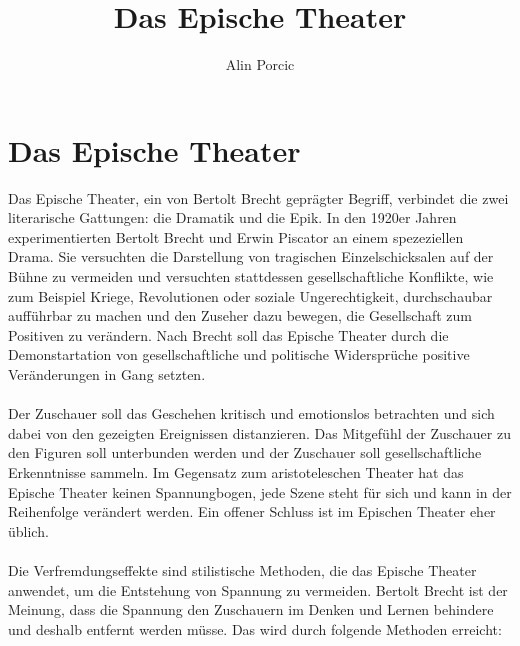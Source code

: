 \documentclass[a4paper]{article}
\title{Das Epische Theater}
\author{Alin Porcic}
\begin{document}
	\maketitle

	\newpage

	\section{Das Epische Theater}

        Das Epische Theater, ein von Bertolt Brecht geprägter Begriff, verbindet die zwei literarische Gattungen: die Dramatik und die Epik. In den 1920er Jahren experimentierten Bertolt Brecht und Erwin Piscator an einem spezeziellen  Drama. Sie versuchten die Darstellung von tragischen Einzelschicksalen auf der Bühne zu vermeiden und versuchten stattdessen gesellschaftliche Konflikte, wie zum Beispiel Kriege, Revolutionen oder soziale Ungerechtigkeit, durchschaubar aufführbar zu machen und den Zuseher dazu bewegen, die Gesellschaft zum Positiven zu verändern. Nach Brecht soll das Epische Theater durch die Demonstartation von gesellschaftliche und politische Widersprüche positive Veränderungen in Gang setzten.\\\\

        Der Zuschauer soll das Geschehen kritisch und emotionslos betrachten und sich dabei von den gezeigten Ereignissen distanzieren. Das Mitgefühl der Zuschauer zu den Figuren soll unterbunden werden und der Zuschauer soll gesellschaftliche Erkenntnisse sammeln. Im Gegensatz zum aristoteleschen Theater hat das Epische Theater keinen Spannungbogen, jede Szene steht für sich und kann in der Reihenfolge verändert werden. Ein offener Schluss ist im Epischen Theater eher üblich.\\\\

	Die Verfremdungseffekte sind stilistische Methoden, die das Epische Theater anwendet, um die Entstehung von Spannung zu vermeiden. Bertolt Brecht ist der Meinung, dass die Spannung den Zuschauern im Denken und Lernen behindere und deshalb entfernt werden müsse. Das wird durch folgende Methoden erreicht:
        
\end{document}
